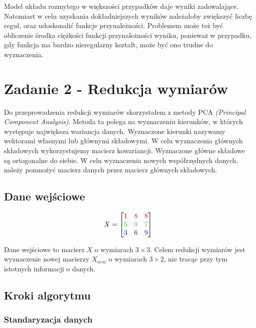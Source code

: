 \documentclass{article}
\begin{document}
Model układu rozmytego w większości przypadków daje wyniki zadowalające.
Natomiast w celu uzyskania dokładniejszych wyników należałoby zwiększyć liczbę reguł,
oraz udoskonalić funkcje przynależności. Problemem może też być obliczenie środka
ciężkości funkcji przynależności wyniku, ponieważ w przypadku, gdy funkcja ma
bardzo nieregularny kształt, może być ono trudne do wyznaczenia.


\section{Zadanie 2 - Redukcja wymiarów}

Do przeprowadzenia redukcji wymiarów skorzystałem z metody PCA \textit{(Principal Component Analysis)}.
Metoda ta polega na wyznaczeniu kierunków, w których występuje największa wariancja danych.
Wyznaczone kierunki nazywamy wektorami własnymi lub głównymi składowymi. 
W celu wyznaczenia głównych składowych
wykorzystujemy macierz kowariancji. Wyznaczone główne składowe są ortogonalne do siebie.
W celu wyznaczenia nowych współrzędnych danych, należy pomnożyć macierz danych przez
macierz głównych składowych.

\subsection{Dane wejściowe}

\begin{equation}
    X = 
    \begin{bmatrix}
        \textcolor{red}{1} & \textcolor{red}{8} & \textcolor{red}{8} \\
        \textcolor{green}{5} & \textcolor{green}{9} & \textcolor{green}{7} \\
        \textcolor{blue}{3} & \textcolor{blue}{6} & \textcolor{blue}{9} \\
    \end{bmatrix}
\end{equation}

Dane wejściowe to macierz $X$ o wymiarach $3 \times 3$. Celem redukcji wymiarów
jest wyznaczenie nowej macierzy $X_{new}$ o wymiarach $3 \times 2$, nie tracąc
przy tym istotnych informacji o danych.

\subsection{Kroki algorytmu}
\subsubsection*{Standaryzacja danych}
\end{document}
